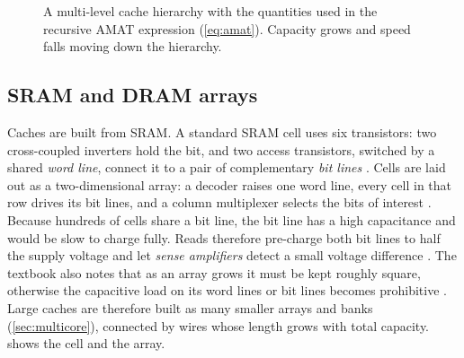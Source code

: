 \begin{figure}[htbp]
\centering
{}
\caption[A multi-level cache hierarchy and the AMAT quantities]{A multi-level cache hierarchy with the quantities used in the recursive AMAT expression (\cref{eq:amat}). Capacity grows and speed falls moving down the hierarchy.}
\label{fig:memory-hierarchy-amat}
\end{figure}

\subsection{SRAM and DRAM arrays}
\label{sec:sram}
Caches are built from SRAM. A standard SRAM cell uses six transistors: two cross-coupled inverters hold the bit, and two access transistors, switched by a shared \emph{word line}, connect it to a pair of complementary \emph{bit lines} \cite[sec.~7.4.1]{sarangi2025basic}. Cells are laid out as a two-dimensional array: a decoder raises one word line, every cell in that row drives its bit lines, and a column multiplexer selects the bits of interest \cite[sec.~7.4.1]{sarangi2025basic}. Because hundreds of cells share a bit line, the bit line has a high capacitance and would be slow to charge fully. Reads therefore pre-charge both bit lines to half the supply voltage and let \emph{sense amplifiers} detect a small voltage difference \cite[sec.~7.4.1]{sarangi2025basic}. The textbook also notes that as an array grows it must be kept roughly square, otherwise the capacitive load on its word lines or bit lines becomes prohibitive \cite[sec.~7.4.1]{sarangi2025basic}. Large caches are therefore built as many smaller arrays and banks (\cref{sec:multicore}), connected by wires whose length grows with total capacity.  shows the cell and the array.

